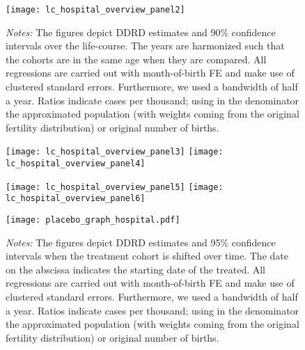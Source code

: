 \begin{landscape}
\begin{figure}[H]
\centering
\begin{minipage}{.9\linewidth}
\texttt{[image: lc\_hospital\_overview\_panel2]}
{\scriptsize \emph{Notes:} The figures depict DDRD estimates and 90\% confidence intervals over the life-course. The years are harmonized such that the cohorts are in the same age when they are compared. All regressions are carried out with month-of-birth FE and make use of clustered standard errors. Furthermore, we used a bandwidth of half a year. Ratios indicate cases per thousand; using in the denominator the approximated population (with weights coming from the original fertility distribution) or original number of births. \par}
\end{minipage}
\end{figure}
\end{landscape}
\begin{figure}[H]%
	\centering
	\texttt{[image: lc\_hospital\_overview\_panel3]}
	\texttt{[image: lc\_hospital\_overview\_panel4]}
\end{figure}
\begin{figure}[H]
	\centering	
	\texttt{[image: lc\_hospital\_overview\_panel5]}
	\texttt{[image: lc\_hospital\_overview\_panel6]}
\end{figure}

\newpage
\begin{landscape}
\begin{figure}[H]
	\centering
    \begin{minipage}{.9\linewidth}
	\texttt{[image: placebo\_graph\_hospital.pdf]}
    {\scriptsize \emph{Notes:} The figures depict DDRD estimates and 95\% confidence intervals when the treatment cohort is shifted over time. The date on the abscissa indicates the starting date of the treated.  All regressions are carried out with month-of-birth FE and make use of clustered standard errors. Furthermore, we used a bandwidth of half a year. Ratios indicate cases per thousand; using in the denominator the approximated population (with weights coming from the original fertility distribution) or original number of births. \par}
    \end{minipage}
\end{figure}
\end{landscape}
